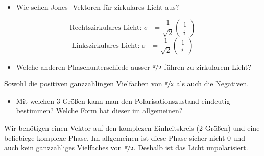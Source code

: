 \documentclass[a4paper,oneside]{article}
\begin{document}
\begin{itemize}
\item Wie sehen Jones- Vektoren für zirkulares Licht aus?
\end{itemize}
\begin{equation}
 \text{Rechtszirkulares Licht: }\sigma^+=\frac{1}{\sqrt{2}}
\left(\begin{array}{c}
       1\\
i
      \end{array}
\right)
\end{equation}
\begin{equation}
 \text{Linkszirkulares Licht: }\sigma^-=\frac{1}{\sqrt{2}}
\left(\begin{array}{c}
       1\\
i
      \end{array}
\right)
\end{equation}
\begin{itemize}
\item Welche anderen Phasenunterschiede ausser $\nicefrac{\pi}{2}$ führen zu zirkularem Licht?
\end{itemize}
Sowohl die positiven ganzzahlingen Vielfachen von $\nicefrac{\pi}{2}$ als auch die Negativen.
\begin{itemize}
\item Mit welchen 3 Größen kann man den Polarisationszustand eindeutig bestimmen? Welche Form hat dieser im allgemeinen?
\end{itemize}
Wir benötigen einen Vektor auf den komplezen Einheitskreis (2 Größen) und eine beliebiege komplexe Phase. Im allgemeinen ist diese Phase sicher nicht $0$ und auch kein ganzzahliges Vielfaches von $\nicefrac{\pi}{2}$. Deshalb ist das Licht unpolarisiert.
\end{document}
